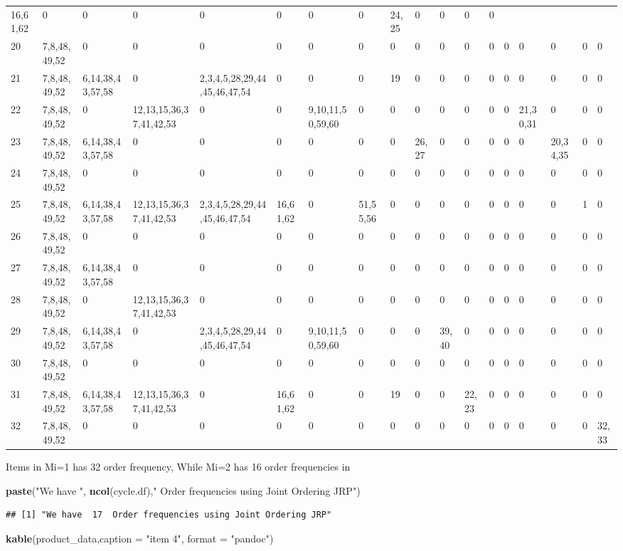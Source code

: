 \documentclass[
]{article}
\newenvironment{Shaded}{\begin{snugshade}}{\end{snugshade}}
\newcommand{\DataTypeTok}[1]{\textcolor[rgb]{0.13,0.29,0.53}{#1}}
\newcommand{\KeywordTok}[1]{\textcolor[rgb]{0.13,0.29,0.53}{\textbf{#1}}}
\newcommand{\NormalTok}[1]{#1}
\newcommand{\StringTok}[1]{\textcolor[rgb]{0.31,0.60,0.02}{#1}}
\begin{document}
\begin{longtable}[]{@{}llllllllllllllllll@{}}
16,61,62 & 0 & 0 & 0 & 0 & 0 & 0 & 0 & 24,25 & 0 & 0 & 0 &
0\tabularnewline
20 & 7,8,48,49,52 & 0 & 0 & 0 & 0 & 0 & 0 & 0 & 0 & 0 & 0 & 0 & 0 & 0 &
0 & 0 & 0\tabularnewline
21 & 7,8,48,49,52 & 6,14,38,43,57,58 & 0 & 2,3,4,5,28,29,44,45,46,47,54
& 0 & 0 & 0 & 19 & 0 & 0 & 0 & 0 & 0 & 0 & 0 & 0 & 0\tabularnewline
22 & 7,8,48,49,52 & 0 & 12,13,15,36,37,41,42,53 & 0 & 0 &
9,10,11,50,59,60 & 0 & 0 & 0 & 0 & 0 & 0 & 0 & 21,30,31 & 0 & 0 &
0\tabularnewline
23 & 7,8,48,49,52 & 6,14,38,43,57,58 & 0 & 0 & 0 & 0 & 0 & 0 & 26,27 & 0
& 0 & 0 & 0 & 0 & 20,34,35 & 0 & 0\tabularnewline
24 & 7,8,48,49,52 & 0 & 0 & 0 & 0 & 0 & 0 & 0 & 0 & 0 & 0 & 0 & 0 & 0 &
0 & 0 & 0\tabularnewline
25 & 7,8,48,49,52 & 6,14,38,43,57,58 & 12,13,15,36,37,41,42,53 &
2,3,4,5,28,29,44,45,46,47,54 & 16,61,62 & 0 & 51,55,56 & 0 & 0 & 0 & 0 &
0 & 0 & 0 & 0 & 1 & 0\tabularnewline
26 & 7,8,48,49,52 & 0 & 0 & 0 & 0 & 0 & 0 & 0 & 0 & 0 & 0 & 0 & 0 & 0 &
0 & 0 & 0\tabularnewline
27 & 7,8,48,49,52 & 6,14,38,43,57,58 & 0 & 0 & 0 & 0 & 0 & 0 & 0 & 0 & 0
& 0 & 0 & 0 & 0 & 0 & 0\tabularnewline
28 & 7,8,48,49,52 & 0 & 12,13,15,36,37,41,42,53 & 0 & 0 & 0 & 0 & 0 & 0
& 0 & 0 & 0 & 0 & 0 & 0 & 0 & 0\tabularnewline
29 & 7,8,48,49,52 & 6,14,38,43,57,58 & 0 & 2,3,4,5,28,29,44,45,46,47,54
& 0 & 9,10,11,50,59,60 & 0 & 0 & 0 & 39,40 & 0 & 0 & 0 & 0 & 0 & 0 &
0\tabularnewline
30 & 7,8,48,49,52 & 0 & 0 & 0 & 0 & 0 & 0 & 0 & 0 & 0 & 0 & 0 & 0 & 0 &
0 & 0 & 0\tabularnewline
31 & 7,8,48,49,52 & 6,14,38,43,57,58 & 12,13,15,36,37,41,42,53 & 0 &
16,61,62 & 0 & 0 & 19 & 0 & 0 & 22,23 & 0 & 0 & 0 & 0 & 0 &
0\tabularnewline
32 & 7,8,48,49,52 & 0 & 0 & 0 & 0 & 0 & 0 & 0 & 0 & 0 & 0 & 0 & 0 & 0 &
0 & 0 & 32,33\tabularnewline
\bottomrule
\end{longtable}

Items in Mi=1 has 32 order frequency, While Mi=2 has 16 order
frequencies in

\begin{Shaded}
\begin{Highlighting}[]
\KeywordTok{paste}\NormalTok{(}\StringTok{"We have "}\NormalTok{, }\KeywordTok{ncol}\NormalTok{(cycle.df),}\StringTok{" Order frequencies using Joint Ordering JRP"}\NormalTok{)}
\end{Highlighting}
\end{Shaded}

\begin{verbatim}
## [1] "We have  17  Order frequencies using Joint Ordering JRP"
\end{verbatim}

\begin{Shaded}
\begin{Highlighting}[]
\KeywordTok{kable}\NormalTok{(product_data,}\DataTypeTok{caption =} \StringTok{"item 4"}\NormalTok{, }\DataTypeTok{format =} \StringTok{"pandoc"}\NormalTok{)}
\end{Highlighting}
\end{Shaded}
\end{document}

